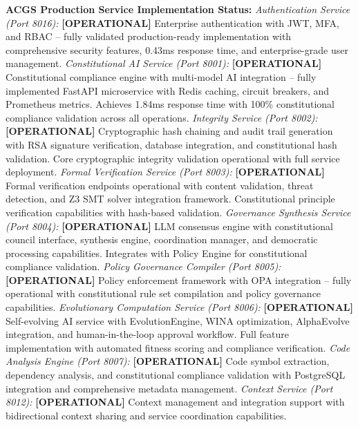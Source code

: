 \documentclass[manuscript,screen,9pt]{acmart}
\begin{document}
\textbf{ACGS Production Service Implementation Status:}
\textit{Authentication Service (Port 8016):} \textbf{[OPERATIONAL]} Enterprise authentication with JWT, MFA, and RBAC -- fully validated production-ready implementation with comprehensive security features, 0.43ms response time, and enterprise-grade user management.
\textit{Constitutional AI Service (Port 8001):} \textbf{[OPERATIONAL]} Constitutional compliance engine with multi-model AI integration -- fully implemented FastAPI microservice with Redis caching, circuit breakers, and Prometheus metrics. Achieves 1.84ms response time with 100\% constitutional compliance validation across all operations.
\textit{Integrity Service (Port 8002):} \textbf{[OPERATIONAL]} Cryptographic hash chaining and audit trail generation with RSA signature verification, database integration, and constitutional hash validation. Core cryptographic integrity validation operational with full service deployment.
\textit{Formal Verification Service (Port 8003):} \textbf{[OPERATIONAL]} Formal verification endpoints operational with content validation, threat detection, and Z3 SMT solver integration framework. Constitutional principle verification capabilities with hash-based validation.
\textit{Governance Synthesis Service (Port 8004):} \textbf{[OPERATIONAL]} LLM consensus engine with constitutional council interface, synthesis engine, coordination manager, and democratic processing capabilities. Integrates with Policy Engine for constitutional compliance validation.
\textit{Policy Governance Compiler (Port 8005):} \textbf{[OPERATIONAL]} Policy enforcement framework with OPA integration -- fully operational with constitutional rule set compilation and policy governance capabilities.
\textit{Evolutionary Computation Service (Port 8006):} \textbf{[OPERATIONAL]} Self-evolving AI service with EvolutionEngine, WINA optimization, AlphaEvolve integration, and human-in-the-loop approval workflow. Full feature implementation with automated fitness scoring and compliance verification.
\textit{Code Analysis Engine (Port 8007):} \textbf{[OPERATIONAL]} Code symbol extraction, dependency analysis, and constitutional compliance validation with PostgreSQL integration and comprehensive metadata management.
\textit{Context Service (Port 8012):} \textbf{[OPERATIONAL]} Context management and integration support with bidirectional context sharing and service coordination capabilities.
\end{document}
